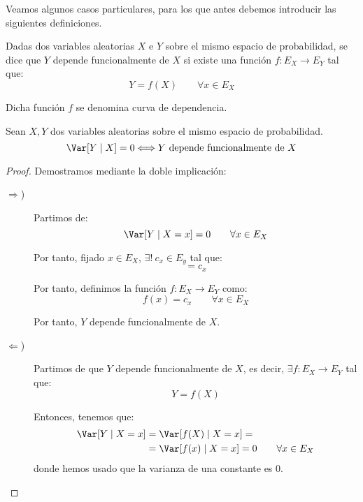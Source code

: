 Veamos algunos casos particulares, para los que antes debemos introducir las siguientes definiciones.
\begin{definicion}
    Dadas dos variables aleatorias $X$ e $Y$ sobre el mismo espacio de probabilidad, se dice que $Y$ depende funcionalmente de $X$ si existe una función $f:E_X\to E_Y$ tal que:
    \begin{equation*}
        Y = f(X) \qquad \forall x\in E_X
    \end{equation*}

    Dicha función $f$ se denomina curva de dependencia.
\end{definicion}
\begin{prop}
    Sean $X,Y$ dos variables aleatorias sobre el mismo espacio de probabilidad.
    \begin{equation*}
        \Var[Y\mid X] = 0 \Longleftrightarrow Y \text{ depende funcionalmente de } X
    \end{equation*}
\end{prop}
\begin{proof}
    Demostramos mediante la doble implicación:
    \begin{description}
        \item[$\Longrightarrow$)] Partimos de:
        \begin{equation*}
            \Var[Y\mid X= x] = 0\qquad \forall x\in E_X
        \end{equation*}
    
        Por tanto, fijado $x\in E_X$, $\exists!~c_x\in E_y$ tal que:
        \begin{equation*}
            [Y\mid X=x] = c_x
        \end{equation*}
    
        Por tanto, definimos la función $f:E_X\to E_Y$ como:
        \begin{equation*}
            f(x) = c_x\qquad \forall x\in E_X
        \end{equation*}

        Por tanto, $Y$ depende funcionalmente de $X$.

        \item[$\Longleftarrow$)] Partimos de que $Y$ depende funcionalmente de $X$, es decir, $\exists f:E_X\to E_Y$ tal que:
        \begin{equation*}
            Y = f(X)
        \end{equation*}

        Entonces, tenemos que:
        \begin{align*}
            \Var[Y\mid X=x] &= \Var[f(X)\mid X=x] =\\&= \Var[f(x)\mid X=x] = 0\qquad \forall x\in E_X
        \end{align*}
        donde hemos usado que la varianza de una constante es 0.
    \end{description}
\end{proof}

